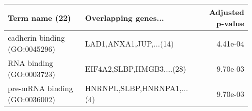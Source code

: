 \begin{tabular}{llr}
\toprule
               Term name (22) &       Overlapping genes... &  Adjusted p-value \\
\midrule
cadherin binding (GO:0045296) &     LAD1,ANXA1,JUP,...(14) &          4.41e-04 \\
     RNA binding (GO:0003723) &  EIF4A2,SLBP,HMGB3,...(28) &          9.70e-03 \\
pre-mRNA binding (GO:0036002) & HNRNPL,SLBP,HNRNPA1,...(4) &          9.70e-03 \\
\bottomrule
\end{tabular}

